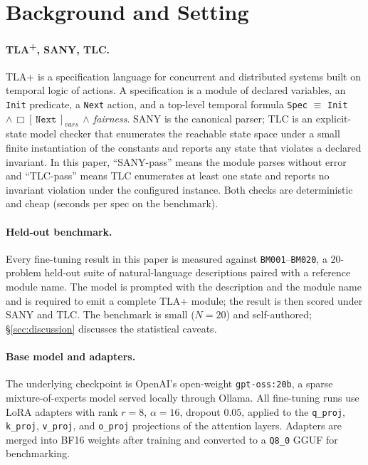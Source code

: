 \documentclass[11pt]{article}
\begin{document}
\section{Background and Setting}
\label{sec:bg}

\paragraph{TLA\textsuperscript{+}, SANY, TLC.} TLA+ is a specification
language for concurrent and distributed systems built on temporal logic
of actions. A specification is a module of declared variables, an
\texttt{Init} predicate, a \texttt{Next} action, and a top-level temporal
formula \texttt{Spec}\,$\,\equiv\,$\,\texttt{Init}\,$\wedge\,\Box[\,\texttt{Next}\,]_{vars}\,\wedge\,$\textit{fairness}.
SANY is the canonical parser; TLC is an explicit-state model checker that
enumerates the reachable state space under a small finite instantiation
of the constants and reports any state that violates a declared
invariant. In this paper, ``SANY-pass'' means the module parses without
error and ``TLC-pass'' means TLC enumerates at least one state and
reports no invariant violation under the configured instance. Both
checks are deterministic and cheap (seconds per spec on the benchmark).

\paragraph{Held-out benchmark.} Every fine-tuning result in this paper is
measured against \texttt{BM001}--\texttt{BM020}, a $20$-problem held-out
suite of natural-language descriptions paired with a reference module
name. The model is prompted with the description and the module name and
is required to emit a complete TLA+ module; the result is then scored
under SANY and TLC. The benchmark is small ($N=20$) and self-authored;
\S\ref{sec:discussion} discusses the statistical caveats.

\paragraph{Base model and adapters.} The underlying checkpoint is
OpenAI's open-weight \texttt{gpt-oss:20b}, a sparse mixture-of-experts
model served locally through Ollama. All fine-tuning runs use LoRA
adapters with rank $r=8$, $\alpha=16$, dropout $0.05$, applied to the
\texttt{q\_proj}, \texttt{k\_proj}, \texttt{v\_proj}, and \texttt{o\_proj}
projections of the attention layers. Adapters are merged into BF16
weights after training and converted to a \texttt{Q8\_0} GGUF for
benchmarking.
\end{document}
